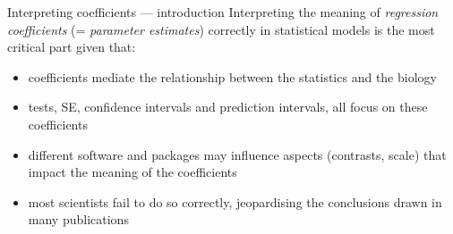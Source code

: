 \documentclass[
  10pt,
  ignorenonframetext,
  aspectratio=169,
  t]{beamer}
\providecommand{\tightlist}{%
  \setlength{\itemsep}{0pt}\setlength{\parskip}{0pt}}
\newcommand{\blueit}[1]{\textcolor{bluebeamer}{\emph{#1}}}
\begin{document}
\begin{frame}{Interpreting coefficients --- introduction}
\protect{}\label{interpreting-coefficients-introduction}
Interpreting the meaning of \blueit{regression coefficients} (=
\blueit{parameter estimates}) correctly in statistical models is the
most critical part given that:

\begin{itemize}[<+->]
\tightlist
\item
  coefficients mediate the relationship between the statistics and the
  biology
\item
  tests, SE, confidence intervals and prediction intervals, all focus on
  these coefficients
\item
  different software and packages may influence aspects (contrasts,
  scale) that impact the meaning of the coefficients
\item
  most scientists fail to do so correctly, jeopardising the conclusions
  drawn in many publications
\end{itemize}

\end{frame}
\end{document}
